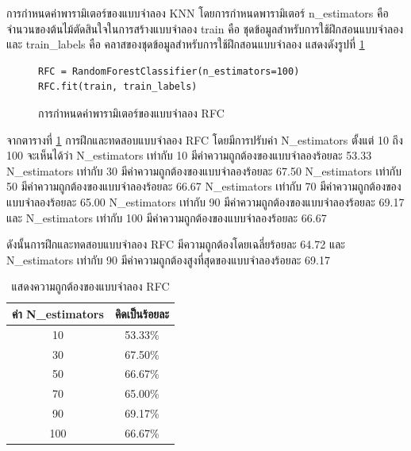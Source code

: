 \begin{enumerate}
			การกำหนดค่าพารามิเตอร์ของแบบจำลอง KNN 
			โดยการกำหนดพารามิเตอร์ n{\_}estimators คือ จำนวนของต้นไม้ตัดสินใจในการสร้างแบบจำลอง 
			train คือ ชุดข้อมูลสำหรับการใช้ฝึกสอนแบบจำลอง 
			และ train{\_}labels คือ คลาสของชุดข้อมูลสำหรับการใช้ฝึกสอนแบบจำลอง 
			แสดงดังรูปที่ \ref{Fig:rfc-para}

			\begin{figure}[H]
				{\begin{lstlisting}
RFC = RandomForestClassifier(n_estimators=100)
RFC.fit(train, train_labels)
				\end{lstlisting}}
				\caption{การกำหนดค่าพารามิเตอร์ของแบบจำลอง RFC}
				\label{Fig:rfc-para}
			\end{figure}

			จากตารางที่ \ref{tab:RFC} การฝึกและทดสอบแบบจำลอง RFC 
			โดยมีการปรับค่า {N\_estimators} ตั้งแต่ 10 ถึง 100 
			จะเห็นได้ว่า {N\_estimators} เท่ากับ 10 มีค่าความถูกต้องของแบบจำลองร้อยละ 53.33 
			{N\_estimators} เท่ากับ 30 มีค่าความถูกต้องของแบบจำลองร้อยละ 67.50 
			{N\_estimators} เท่ากับ 50 มีค่าความถูกต้องของแบบจำลองร้อยละ 66.67 
			{N\_estimators} เท่ากับ 70 มีค่าความถูกต้องของแบบจำลองร้อยละ 65.00 
			{N\_estimators} เท่ากับ 90 มีค่าความถูกต้องของแบบจำลองร้อยละ 69.17 
			และ {N\_estimators} เท่ากับ 100 มีค่าความถูกต้องของแบบจำลองร้อยละ 66.67

			ดังนั้นการฝึกและทดสอบแบบจำลอง RFC มีความถูกต้องโดยเฉลี่ยร้อยละ 64.72 และ {N\_estimators} เท่ากับ 90 มีค่าความถูกต้องสูงที่สุดของแบบจำลองร้อยละ 69.17 

			\begin{table}[H]
				\centering
				\caption{แสดงความถูกต้องของแบบจำลอง RFC}
				\label{tab:RFC}
				\begin{tabular}{|c|c|}
				\hline
				ค่า N\_estimators & คิดเป็นร้อยละ \\ \hline				
				10 &  53.33\% \\ \hline
				30 &  67.50\% \\ \hline
				50 &  66.67\% \\ \hline
				70 &  65.00\% \\ \hline
				90 &  69.17\% \\ \hline
				100 &  66.67\% \\ \hline
				\end{tabular}
			\end{table}




\end{enumerate}
